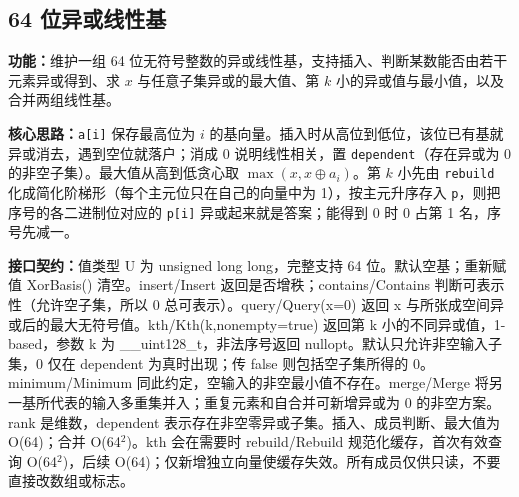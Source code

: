 \subsection{64 位异或线性基}\label{compact-XorBasis}

\noindent\textbf{功能：}\allowbreak 维护一组 64 位无符号整数的异或线性基，支持插入、判断某数能否由若干元素异或得到、求 $x$ 与任意子集异或的最大值、第 $k$ 小的异或值与最小值，以及合并两组线性基。

\textbf{核心思路：}\allowbreak \texttt{a[i]} 保存最高位为 $i$ 的基向量。插入时从高位到低位，该位已有基就异或消去，遇到空位就落户；消成 0 说明线性相关，置 \texttt{dependent}（存在异或为 0 的非空子集）。最大值从高到低贪心取 $\max(x,x\oplus a_i)$。第 $k$ 小先由 \texttt{rebuild} 化成简化阶梯形（每个主元位只在自己的向量中为 1），按主元升序存入 \texttt{p}，则把序号的各二进制位对应的 \texttt{p[i]} 异或起来就是答案；能得到 0 时 0 占第 1 名，序号先减一。



{\sloppy{}\noindent\textbf{接口契约：}值类型 U 为 unsigned long long，完整支持 64 位。默认空基；重新赋值 XorBasis() 清空。insert/Insert 返回是否增秩；contains/Contains 判断可表示性（允许空子集，所以 0 总可表示）。query/Query(x=0) 返回 x 与所张成空间异或后的最大无符号值。kth/Kth(k,nonempty=true) 返回第 k 小的不同异或值，1-based，参数 k 为 \_\_uint128\_t，非法序号返回 nullopt。默认只允许非空输入子集，0 仅在 dependent 为真时出现；传 false 则包括空子集所得的 0。minimum/Minimum 同此约定，空输入的非空最小值不存在。merge/Merge 将另一基所代表的输入多重集并入；重复元素和自合并可新增异或为 0 的非空方案。rank 是维数，dependent 表示存在非空零异或子集。插入、成员判断、最大值为 O(64)；合并 O(64$^{2}$)。kth 会在需要时 rebuild/Rebuild 规范化缓存，首次有效查询 O(64$^{2}$)，后续 O(64)；仅新增独立向量使缓存失效。所有成员仅供只读，不要直接改数组或标志。\par}

\Needspace{387pt}



\newpage



\newpage



\Needspace{330pt}


